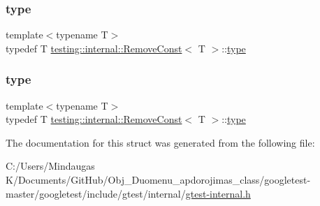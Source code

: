 \mbox{\label{structtesting_1_1internal_1_1_remove_const_a1be32027ea4edcc0d15abd59aba4a97f}} 
\subsubsection{\texorpdfstring{type}{type}\hspace{0.1cm}{\footnotesize\ttfamily [2/3]}}
{\footnotesize\ttfamily template$<$typename T$>$ \\
typedef T \mbox{\hyperlink{structtesting_1_1internal_1_1_remove_const}{testing\+::internal\+::\+Remove\+Const}}$<$ T $>$\+::\mbox{\hyperlink{structtesting_1_1internal_1_1_remove_const_a1be32027ea4edcc0d15abd59aba4a97f}{type}}}

\mbox{\label{structtesting_1_1internal_1_1_remove_const_a1be32027ea4edcc0d15abd59aba4a97f}} 
\subsubsection{\texorpdfstring{type}{type}\hspace{0.1cm}{\footnotesize\ttfamily [3/3]}}
{\footnotesize\ttfamily template$<$typename T$>$ \\
typedef T \mbox{\hyperlink{structtesting_1_1internal_1_1_remove_const}{testing\+::internal\+::\+Remove\+Const}}$<$ T $>$\+::\mbox{\hyperlink{structtesting_1_1internal_1_1_remove_const_a1be32027ea4edcc0d15abd59aba4a97f}{type}}}



The documentation for this struct was generated from the following file\+:\begin{DoxyCompactItemize}
\item 
C\+:/\+Users/\+Mindaugas K/\+Documents/\+Git\+Hub/\+Obj\+\_\+\+Duomenu\+\_\+apdorojimas\+\_\+class/googletest-\/master/googletest/include/gtest/internal/\mbox{\hyperlink{googletest-master_2googletest_2include_2gtest_2internal_2gtest-internal_8h}{gtest-\/internal.\+h}}\end{DoxyCompactItemize}
